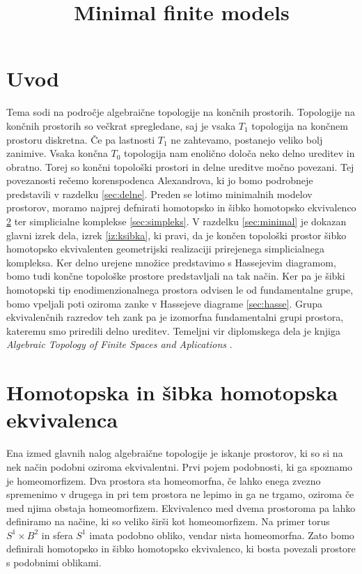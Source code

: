 \documentclass[mat1]{fmfdelo}
\title{Minimal finite models}
\begin{document}
\section{Uvod}

Tema sodi na področje algebraične topologije na končnih prostorih. Topologije na končnih prostorih so večkrat spregledane, saj je vsaka $T_1$ topologija
na končnem prostoru diskretna. Če pa lastnosti $T_1$ ne zahtevamo, postanejo veliko bolj zanimive. Vsaka končna $T_0$ 
topologija nam enolično določa neko delno ureditev in obratno. Torej so končni topološki prostori in delne ureditve močno povezani. Tej povezanosti rečemo korenspodenca Alexandrova, ki jo bomo podrobneje predstavili v razdelku \ref{sec:delne}. Preden se lotimo minimalnih modelov prostorov, moramo najprej 
defnirati homotopsko in šibko homotopsko ekvivalenco \ref{sec:1} ter simplicialne komplekse \ref{sec:simpleks}. V razdelku \ref{sec:minimal} je dokazan glavni izrek dela, izrek \ref{iz:ksibka}, ki pravi, da je končen topološki prostor šibko homotopsko ekvivalenten geometrijski realizaciji 
prirejenega simplicialnega kompleksa. Ker delno urejene množice predstavimo s Hassejevim diagramom, bomo tudi končne topološke prostore predstavljali na tak način. Ker pa je šibki homotopski tip enodimenzionalnega prostora odvisen le od fundamentalne 
grupe, bomo vpeljali poti oziroma zanke v Hassejeve diagrame \ref{sec:hasse}. Grupa ekvivalenčnih razredov teh zank pa je izomorfna fundamentalni grupi prostora, kateremu smo priredili delno ureditev. Temeljni vir diplomskega dela je knjiga 
\textit{Algebraic Topology of Finite Spaces and Aplications} \cite{barmak}.

\section{Homotopska in šibka homotopska ekvivalenca}\label{sec:1}

Ena izmed glavnih nalog algebraične topologije je iskanje prostorov, ki so si 
na nek način podobni oziroma ekvivalentni. Prvi pojem podobnosti, ki ga spoznamo
je homeomorfizem. Dva prostora sta homeomorfna, če lahko enega zvezno spremenimo v drugega in pri tem prostora ne lepimo in ga ne trgamo, oziroma če med njima obstaja homeomorfizem. Ekvivalenco med dvema 
prostoroma pa lahko definiramo na načine, ki so veliko širši kot homeomorfizem.
Na primer torus $S^1\times B^2$ in sfera $S^1$ imata podobno obliko, vendar nista
 homeomorfna. Zato bomo definirali homotopsko in šibko homotopsko ekvivalenco, ki bosta povezali prostore s podobnimi oblikami.
\end{document}
